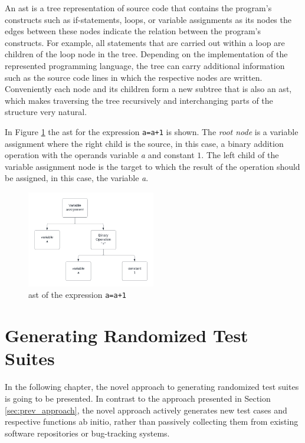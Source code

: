 \documentclass[
fancyheadings, %
%
%
]{stsreprt}
\begin{document}
An \acrshort{ast} is a tree representation of source code that contains the program's constructs such as if-statements, loops, or variable assignments as its nodes the edges between these nodes indicate the relation between the program's constructs. 
For example, all statements that are carried out within a loop are children of the loop node in the tree. 
Depending on the implementation of the represented programming language, the tree can carry additional information such as the source code lines in which the respective nodes are written. 
Conveniently each node and its children form a new subtree that is also an \acrshort{ast}, which makes traversing the tree recursively and interchanging parts of the structure very natural.\par

In Figure \ref{fig:simple_ast} the \acrshort{ast} for the expression \lstinline{a=a+1} is shown. 
The \textit{root node} is a variable assignment where the right child is the source, in this case, a binary addition operation with the operands variable \textit{a} and constant $1$. 
The left child of the variable assignment node is the target to which the result of the operation should be assigned, in this case, the variable \textit{a}.

\begin{figure}[h]
    \centering
    \includegraphics[width=0.5\textwidth]{img/simple_ast.png}
    \caption{\acrshort{ast} of the expression  \lstinline{a=a+1}}
    \label{fig:simple_ast}
\end{figure}


\chapter{Generating Randomized Test Suites} \label{ch:approach}
In the following chapter, the novel approach to generating randomized test suites is going to be presented. In contrast to the approach presented in Section \ref{sec:prev_approach}, the novel approach actively generates new test cases and respective functions ab initio, rather than passively collecting them from existing software repositories or bug-tracking systems. \par
\end{document}
